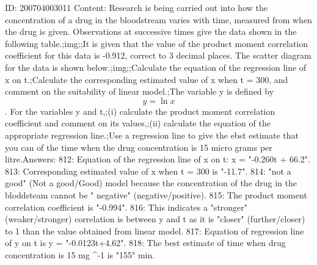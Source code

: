 \documentclass{article}
\begin{document}
ID: 200704003011
Content:
Research is being carried out into how the concentration of a drug in the bloodstream varies with time, measured from when the drug is given. Observations at successive times give the data shown in the following table.;img;;It is given that the value of the product moment correlation coefficient for this data is -0.912, correct to 3 decimal places. The scatter diagram for the data is shown below.;img;;Calculate the equation of the regression line of x on t.;Calculate the corresponding estimated value of x when t = 300, and comment on the suitability of linear model.;The variable y is defined by $$y = \ln x$$. For the variables y and t,;(i) calculate the product moment correlation coefficient and comment on its values,;(ii) calculate the equation of the appropriate regression line.;Use a regression line to give the ebst estimate that you can of the time when the drug concentration is 15 micro grams per litre.Answers:
812: Equation of the regression line of x on t: x = "-0.260t + 66.2".
813: Corresponding estimated value of x when t = 300 is "-11.7".
814: "not a good" (Not a good/Good) model because the concentration of the drug in the bloddsteam cannot be " negative" (negative/positive).
815: The product moment correlation coefficient is "-0.994".
816: This indicates a "stronger" (weaker/stronger) correlation is between y and t as it is "closer" (further/closer) to 1 than the value obtained from linear model.
817: Equation of regression line of y on t is y = "-0.0123t+4.62".
818: The best estimate of time when drug concentration is 15 mg \ell^{-1} is "155" min.
\end{document}
